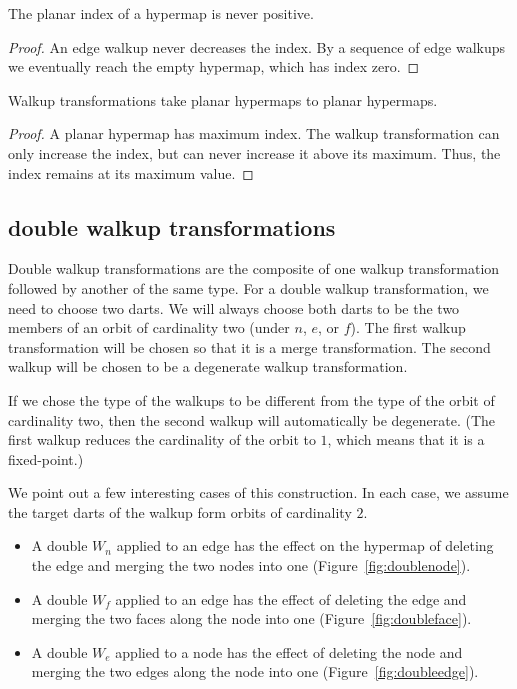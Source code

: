 \begin{lemma}  The planar index
of a hypermap is never positive.
\end{lemma}

\begin{proof}  An edge walkup never decreases the index.  By a sequence
of edge walkups we eventually reach the empty hypermap, which has
index zero.
\end{proof}


\begin{lemma} Walkup transformations take planar hypermaps to planar
hypermaps.
\end{lemma}

\begin{proof}  
A planar hypermap has maximum index.  The walkup
transformation can only increase the index, but can never increase
it above its maximum.  Thus, the index remains at its maximum value.
\end{proof}


\subsection{double walkup transformations}

Double walkup transformations are the composite of one walkup
transformation followed by another of the same type.  For a double
walkup transformation, we need to choose two darts.  We will always
choose both darts to be the two members of an orbit of cardinality
two (under $n$, $e$, or $f$).  The first walkup transformation will be
chosen so that it is a merge transformation.  The second walkup will
be chosen to be a degenerate walkup transformation.

If we chose the type of the walkups to be different from the type of
the orbit of cardinality two, then the second walkup will
automatically be degenerate.  (The first walkup reduces the
cardinality of the orbit to $1$, which means that it is a
fixed-point.)

We point out a few interesting cases of this construction. In each
case, we assume the target darts of the walkup form orbits of
cardinality $2$.
\begin{itemize}
    \item A double $W_n$ applied to an edge has the effect on
    the hypermap of deleting the edge and merging the two nodes into
    one (Figure~\ref{fig:doublenode}). 
    \item A double $W_f$ applied to an edge has the effect of
    deleting the edge and merging the two faces along the node into
    one (Figure~\ref{fig:doubleface}).
    \item A double $W_e$ applied to a node has the effect of
    deleting the node and merging the two edges along the node into
    one (Figure~\ref{fig:doubleedge}).
\end{itemize}


